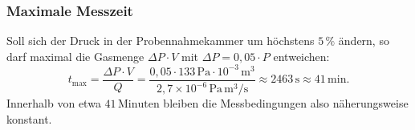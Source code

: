 \documentclass{article}
\begin{document}
\subsubsection*{Maximale Messzeit}

Soll sich der Druck in der Probennahmekammer um höchstens $5\,\%$
ändern, so darf maximal die Gasmenge $\Delta P \cdot V$ mit
$\Delta P = 0{,}05 \cdot P$ entweichen:
\begin{equation}
    t_{\mathrm{max}} = \frac{\Delta P \cdot V}{Q}
    = \frac{0{,}05 \cdot 133\,\mathrm{Pa} \cdot 10^{-3}\,\mathrm{m^3}}
           {2{,}7 \times 10^{-6}\,\mathrm{Pa\,m^3/s}}
    \approx 2463\,\mathrm{s} \approx 41\,\mathrm{min}.
\end{equation}
Innerhalb von etwa $41\,\mathrm{Minuten}$ bleiben die Messbedingungen
also näherungsweise konstant.




\newpage
\nocite{ainotice}
\printbibliography %
\end{document}
